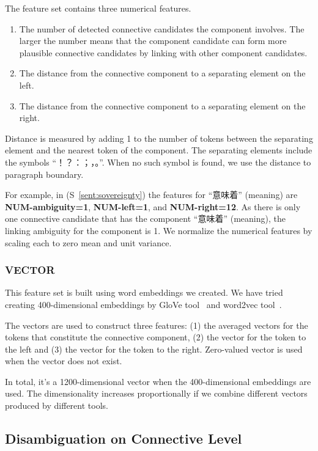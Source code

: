 The feature set contains three numerical features.

\begin{enumerate}
    \item The number of detected connective candidates the component involves. The larger
        the number means that the component candidate can form more plausible connective
        candidates by linking with other component candidates.
    \item The distance from the connective component to a separating element on the left.
    \item The distance from the connective component to a
        separating element on the right.
\end{enumerate}

Distance is measured by adding 1 to the number of tokens
between the separating element and the nearest token of the component.
The separating elements include the symbols ``！？：；，。''.
When no such symbol is found, we use the distance to paragraph boundary.

For example, in (S~\ref{sent:sovereignty}) the features for “意味着” (meaning) are \textbf{NUM-ambiguity=1},
\textbf{NUM-left=1}, and \textbf{NUM-right=12}. As there is only one connective candidate that has the
component “意味着” (meaning), the linking ambiguity for the component is 1.
We normalize the numerical features by scaling each to zero mean and unit variance.


\subsubsection{VECTOR}

This feature set is built using word embeddings we created.
We have tried creating 400-dimensional embeddings by GloVe tool~\citep{pennington2014glove}
and word2vec tool~\citep{mikolov2013efficient,mikolov2013distributed}.

The vectors are used to construct three features: (1) the averaged vectors
for the tokens that constitute the connective component, (2) the vector for the
token to the left and (3) the vector for the token to the right. Zero-valued vector is used
when the vector does not exist.

In total, it's a 1200-dimensional vector when the 400-dimensional embeddings are used.
The dimensionality increases proportionally if we combine different vectors produced by
different tools.

\subsection{Disambiguation on Connective Level}
\label{s:discourse-disambig-connective}


